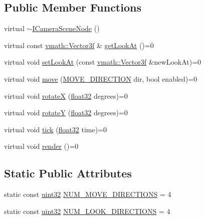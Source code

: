 \subsection*{Public Member Functions}
\begin{DoxyCompactItemize}
\item 
virtual \hyperlink{classicee_1_1engine_1_1ICameraSceneNode_a6a5b592cf16937061d79ba6be5d0f966}{$\sim$ICameraSceneNode} ()
\item 
virtual const \hyperlink{classvmath_1_1Vector3f}{vmath::Vector3f} \& \hyperlink{classicee_1_1engine_1_1ICameraSceneNode_a4cb57ce68580cac469fb3b5b0a76ce59}{getLookAt} ()=0
\item 
virtual void \hyperlink{classicee_1_1engine_1_1ICameraSceneNode_ad19ccccd889c46a18ff7cc8e09fda813}{setLookAt} (const \hyperlink{classvmath_1_1Vector3f}{vmath::Vector3f} \&newLookAt)=0
\item 
virtual void \hyperlink{classicee_1_1engine_1_1ICameraSceneNode_a8f71e3eb97bbad32482358b712aa7e1a}{move} (\hyperlink{classicee_1_1engine_1_1ICameraSceneNode_a47efe47a91708ebed42249f6304309ae}{MOVE\_\-DIRECTION} dir, bool enabled)=0
\item 
virtual void \hyperlink{classicee_1_1engine_1_1ICameraSceneNode_a2555d17b958bd2f412139daeb73c9e27}{rotateX} (\hyperlink{namespacecompatibility_a32a2d006ac2172c0f859370287f0104c}{float32} degrees)=0
\item 
virtual void \hyperlink{classicee_1_1engine_1_1ICameraSceneNode_af3a40b3f41e7eac5d45acbabacac9258}{rotateY} (\hyperlink{namespacecompatibility_a32a2d006ac2172c0f859370287f0104c}{float32} degrees)=0
\item 
virtual void \hyperlink{classicee_1_1engine_1_1ICameraSceneNode_a06dcb1ef06cfb323a088936f066d875e}{tick} (\hyperlink{namespacecompatibility_a32a2d006ac2172c0f859370287f0104c}{float32} time)=0
\item 
virtual void \hyperlink{classicee_1_1engine_1_1ICameraSceneNode_af4996793cf1cc2d0ccdf541e94ac9609}{render} ()=0
\end{DoxyCompactItemize}
\subsection*{Static Public Attributes}
\begin{DoxyCompactItemize}
\item 
static const \hyperlink{namespacecompatibility_a51e8fe2956b4f39fe1fae96cec0d8393}{uint32} \hyperlink{classicee_1_1engine_1_1ICameraSceneNode_aeb9040df9d774467ed2a8c82b0f434d6}{NUM\_\-MOVE\_\-DIRECTIONS} = 4
\item 
static const \hyperlink{namespacecompatibility_a51e8fe2956b4f39fe1fae96cec0d8393}{uint32} \hyperlink{classicee_1_1engine_1_1ICameraSceneNode_a2447c4155f864c390fe95f8d227bc404}{NUM\_\-LOOK\_\-DIRECTIONS} = 4
\end{DoxyCompactItemize}


